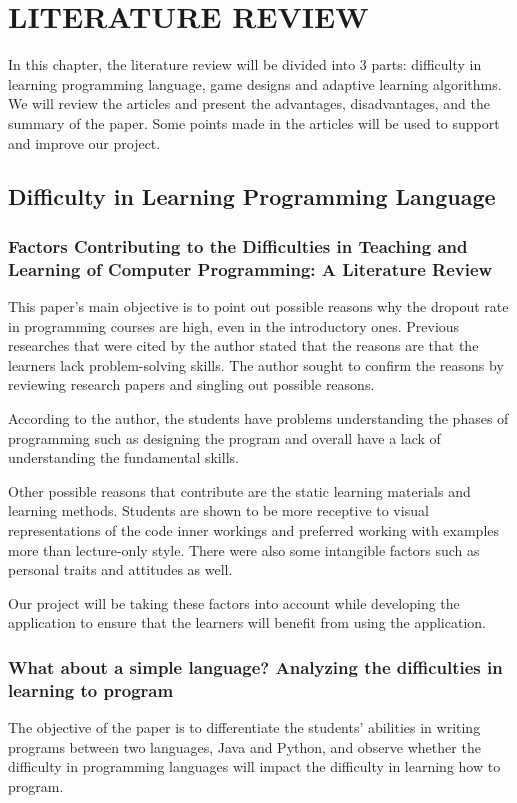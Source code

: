 \chapter{LITERATURE REVIEW}

In this chapter, the literature review will be divided into 3 parts: difficulty in learning programming language, game designs and adaptive learning algorithms. We will review the articles and present the advantages, disadvantages, and the summary of the paper. Some points made in the articles will be used to support and improve our project.

\section{Difficulty in Learning Programming Language}
\subsection{Factors Contributing to the Difficulties in Teaching and Learning of Computer Programming: A Literature Review \cite{Factors}}
This paper’s main objective is to point out possible reasons why the dropout rate in programming courses are high, even in the introductory ones. Previous researches that were cited by the author stated that the reasons are that the learners lack problem-solving skills. The author sought to confirm the reasons by reviewing research papers and singling out possible reasons.

According to the author, the students have problems understanding the phases of programming such as designing the program and overall have a lack of understanding the fundamental skills. 

Other possible reasons that contribute are the static learning materials and learning methods. Students are shown to be more receptive to visual representations of the code inner workings and preferred working with examples more than lecture-only style. There were also some intangible factors such as personal traits and attitudes as well.

Our project will be taking these factors into account while developing the application to ensure that the learners will benefit from using the application.
\subsection{What about a simple language? Analyzing the difficulties in learning to program \cite{Analyze}}
The objective of the paper is to differentiate the students’ abilities in writing programs between two languages, Java and Python, and observe whether the difficulty in programming languages will impact the difficulty in learning how to program.

